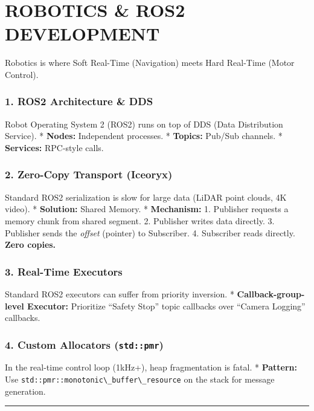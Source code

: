 \hypertarget{robotics-ros2-development}{%
\chapter{ROBOTICS \& ROS2 DEVELOPMENT}\label{robotics-ros2-development}}

Robotics is where Soft Real-Time (Navigation) meets Hard Real-Time
(Motor Control).

\hypertarget{ros2-architecture-dds}{%
\subsection{1. ROS2 Architecture \& DDS}\label{ros2-architecture-dds}}

Robot Operating System 2 (ROS2) runs on top of DDS (Data Distribution
Service). * \textbf{Nodes:} Independent processes. * \textbf{Topics:}
Pub/Sub channels. * \textbf{Services:} RPC-style calls.

\hypertarget{zero-copy-transport-iceoryx}{%
\subsection{2. Zero-Copy Transport
(Iceoryx)}\label{zero-copy-transport-iceoryx}}

Standard ROS2 serialization is slow for large data (LiDAR point clouds,
4K video). * \textbf{Solution:} Shared Memory. * \textbf{Mechanism:} 1.
Publisher requests a memory chunk from shared segment. 2. Publisher
writes data directly. 3. Publisher sends the \emph{offset} (pointer) to
Subscriber. 4. Subscriber reads directly. \textbf{Zero copies.}

\hypertarget{real-time-executors}{%
\subsection{3. Real-Time Executors}\label{real-time-executors}}

Standard ROS2 executors can suffer from priority inversion. *
\textbf{Callback-group-level Executor:} Prioritize ``Safety Stop'' topic
callbacks over ``Camera Logging'' callbacks.

\hypertarget{custom-allocators-stdpmr}{%
\subsection{\texorpdfstring{4. Custom Allocators
(\texttt{std::pmr})}{4. Custom Allocators (std::pmr)}}\label{custom-allocators-stdpmr}}

In the real-time control loop (1kHz+), heap fragmentation is fatal. *
\textbf{Pattern:} Use
\passthrough{\lstinline!std::pmr::monotonic\_buffer\_resource!} on the
stack for message generation.

\begin{center}\rule{0.5\linewidth}{0.5pt}\end{center}
